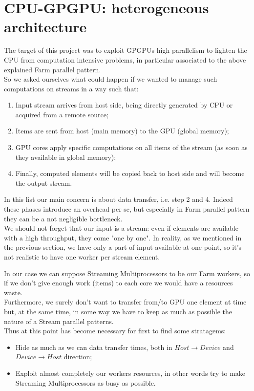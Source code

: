 \section{CPU-GPGPU: heterogeneous architecture}
The target of this project was to exploit GPGPUs high parallelism to lighten the CPU from computation intensive problems, in particular associated to the above explained Farm parallel pattern.\\
So we asked ourselves what could happen if we wanted to manage such computations on streams in a way such that:
\begin{enumerate}
	\item Input stream arrives from host side, being directly generated by CPU or acquired from a remote source;
	
	\item Items are sent from host (main memory) to the GPU (global memory);
	
	\item GPU cores apply specific computations on all items of the stream (as soon as they available in global memory);
	
	\item Finally, computed elements will be copied back to host side and will become the output stream. \\
\end{enumerate}

	In this list our main concern is about data transfer, i.e. step 2 and 4. 
	Indeed these phases introduce an overhead per se, but especially in Farm parallel pattern they can be a not negligible bottleneck.\\
	We should not forget that our input is a stream: even if elements are available with a high throughput, they come "one by one".
	In reality, as we mentioned in the previous section, we have only a part of input available at one point, so it's not realistic to have one worker per stream element.
	
	In our case we can suppose Streaming Multiprocessors to be our Farm workers, so if we don't give enough work (items) to each core we would have a resources waste.\\
	Furthermore, we surely don't want to transfer from/to GPU one element at time but, at the same time, in some way we have to keep as much as possible the nature of a Stream parallel patterns.\\	
	Thus at this point has become necessary for first to find some stratagems:
	\begin{itemize}
		\item Hide as much as we can data transfer times, both in  \(Host \rightarrow Device\)  and  \(Device \rightarrow Host\)  direction;
		\item Exploit almost completely our workers resources, in other words try to make Streaming Multiprocessors as busy as possible.
	\end{itemize}

